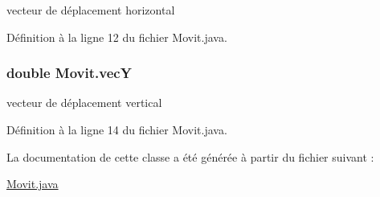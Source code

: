 vecteur de déplacement horizontal 


\begin{DoxyItemize}
\item 
\end{DoxyItemize}

Définition à la ligne 12 du fichier Movit.\-java.

\hypertarget{class_movit_abfe200611d0a57b9642337e0494ee1f9}{
\subsubsection[{vec\-Y}]{\setlength{\rightskip}{0pt plus 5cm}double Movit.\-vec\-Y\hspace{0.3cm}{\ttfamily [protected]}}}\label{class_movit_abfe200611d0a57b9642337e0494ee1f9}


vecteur de déplacement vertical 


\begin{DoxyItemize}
\item 
\end{DoxyItemize}

Définition à la ligne 14 du fichier Movit.\-java.



La documentation de cette classe a été générée à partir du fichier suivant \-:\begin{DoxyCompactItemize}
\item 
\hyperlink{_movit_8java}{Movit.\-java}\end{DoxyCompactItemize}
